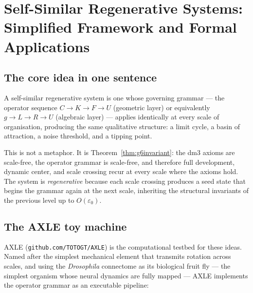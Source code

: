 
\section{Self-Similar Regenerative Systems: Simplified Framework
  and Formal Applications}
\label{sec:applications}

\subsection{The core idea in one sentence}

A self-similar regenerative system is one whose governing grammar
--- the operator sequence $C \to K \to F \to U$ (geometric layer)
or equivalently $g \to L \to R \to U$ (algebraic layer) --- applies
identically at every scale of organisation, producing the same
qualitative structure: a limit cycle, a basin of attraction, a
noise threshold, and a tipping point.

This is not a metaphor. It is Theorem~\ref{thm:g6invariant}: the
dm3 axioms are scale-free, the operator grammar is scale-free,
and therefore full development, dynamic center, and scale crossing
recur at every scale where the axioms hold. The system is
\emph{regenerative} because each scale crossing produces a seed
state that begins the grammar again at the next scale, inheriting
the structural invariants of the previous level up to
$O(\varepsilon_0)$.

\subsection{The AXLE toy machine}

AXLE (\texttt{github.com/TOTOGT/AXLE}) is the computational
testbed for these ideas. Named after the simplest mechanical
element that transmits rotation across scales, and using the
\emph{Drosophila} connectome as its biological fruit fly ---
the simplest organism whose neural dynamics are fully mapped
--- AXLE implements the operator grammar as an executable
pipeline:

